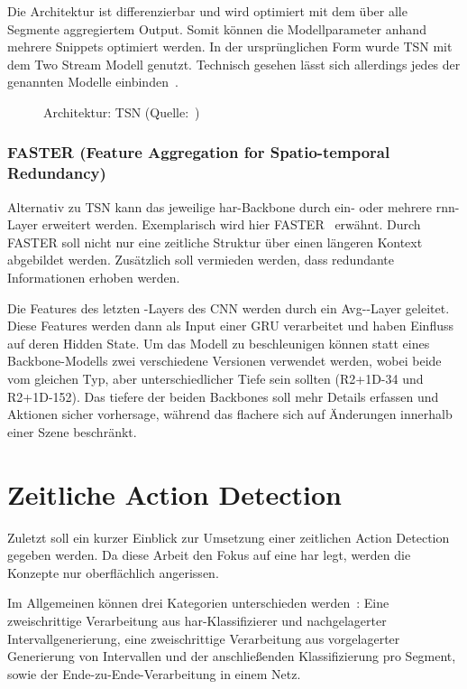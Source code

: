 Die Architektur ist differenzierbar und wird optimiert mit dem über alle Segmente aggregiertem Output.
Somit können die Modellparameter anhand mehrere Snippets optimiert werden.
In der ursprünglichen Form wurde TSN mit dem Two Stream Modell genutzt.
Technisch gesehen lässt sich allerdings jedes der genannten Modelle einbinden~\cite{Kothawade19}.

\begin{figure}[h!]
    \centering
    \caption{Architektur: TSN (Quelle:~\cite{Wang19})}
    \label{fig:tsn}
\end{figure}

\subsubsection*{FASTER (Feature Aggregation for Spatio-temporal Redundancy)}

Alternativ zu TSN kann das jeweilige \gls{har}-Backbone durch ein- oder mehrere \gls{rnn}-Layer erweitert werden.
Exemplarisch wird hier FASTER~\cite{Zhu19} erwähnt.
Durch FASTER soll nicht nur eine zeitliche Struktur über einen längeren Kontext abgebildet werden.
Zusätzlich soll vermieden werden, dass redundante Informationen erhoben werden.

Die Features des letzten \conv-Layers des CNN werden durch ein Avg-\pool-Layer geleitet.
Diese Features werden dann als Input einer GRU verarbeitet und haben Einfluss auf deren Hidden State.
Um das Modell zu beschleunigen können statt eines Backbone-Modells zwei verschiedene Versionen verwendet werden, wobei beide vom gleichen Typ, aber unterschiedlicher Tiefe sein sollten (\zB R2+1D-34 und R2+1D-152).
Das tiefere der beiden Backbones soll mehr Details erfassen und Aktionen sicher vorhersage, während das flachere sich auf Änderungen innerhalb einer Szene beschränkt.

\section{Zeitliche Action Detection}
\label{sec:temporal-action-detection}

Zuletzt soll ein kurzer Einblick zur Umsetzung einer zeitlichen Action Detection gegeben werden.
Da diese Arbeit den Fokus auf eine \gls{har} legt, werden die Konzepte nur oberflächlich angerissen.

Im Allgemeinen können drei Kategorien unterschieden werden~\cite{Buch17}:
Eine zweischrittige Verarbeitung aus \gls{har}-Klassifizierer und nachgelagerter Intervallgenerierung, eine zweischrittige Verarbeitung aus vorgelagerter Generierung von Intervallen und der anschließenden Klassifizierung pro Segment, sowie der Ende-zu-Ende-Verarbeitung in einem Netz.

